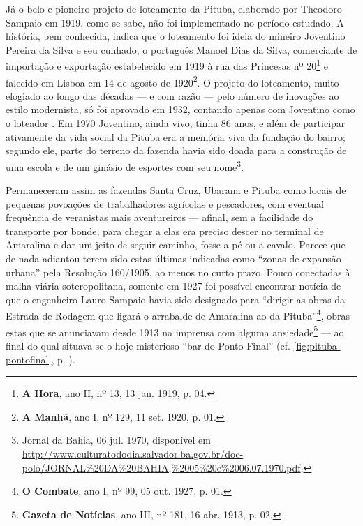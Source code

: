 Já o belo e pioneiro projeto de loteamento da Pituba, elaborado por Theodoro Sampaio em 1919, como se sabe, não foi implementado no período estudado. A história, bem conhecida, indica que o loteamento foi ideia do mineiro Joventino Pereira da Silva e seu cunhado, o português Manoel Dias da Silva, comerciante de importação e exportação estabelecido em 1919 à rua das Princesas nº 20\footnote{\textbf{A Hora}, ano II, nº 13, 13 jan. 1919, p. 04.} e falecido em Lisboa em 14 de agosto de 1920\footnote{\textbf{A Manhã}, ano I, nº 129, 11 set. 1920, p. 01.}. O projeto do loteamento, muito elogiado ao longo das décadas --- e com razão --- pelo número de inovações ao estilo modernista, só foi aprovado em 1932, contando apenas com Joventino como o loteador \cite{leme_urbanismo_1999,santos_theodoro_2010}. Em 1970 Joventino, ainda vivo, tinha 86 anos, e além de participar ativamente da vida social da Pituba era a memória viva da fundação do bairro; segundo ele, parte do terreno da fazenda havia sido doada para a construção de uma escola e de um ginásio de esportes com seu nome\footnote{Jornal da Bahia, 06 jul. 1970, disponível em \url{http://www.culturatododia.salvador.ba.gov.br/doc-polo/JORNAL\%20DA\%20BAHIA,\%2005\%20e\%2006.07.1970.pdf}.}. 

Permaneceram assim as fazendas Santa Cruz, Ubarana e Pituba como locais de pequenas povoações de trabalhadores agrícolas e pescadores, com eventual frequência de veranistas mais aventureiros --- afinal, sem a facilidade do transporte por bonde, para chegar a elas era preciso descer no terminal de Amaralina e dar um jeito de seguir caminho, fosse a pé ou a cavalo. Parece que de nada adiantou terem sido estas últimas indicadas como ``zonas de expansão urbana'' pela Resolução 160/1905, ao menos no curto prazo. Pouco conectadas à malha viária soteropolitana, somente em 1927 foi possível encontrar notícia de que o engenheiro Lauro Sampaio havia sido designado para ``dirigir as obras da Estrada de Rodagem que ligará o arrabalde de Amaralina ao da Pituba''\footnote{\textbf{O Combate}, ano I, nº 99, 05 out. 1927, p. 01.}, obras estas que se anunciavam desde 1913 na imprensa com alguma ansiedade\footnote{\textbf{Gazeta de Notícias}, ano III, nº 181, 16 abr. 1913, p. 02.} --- ao final do qual situava-se o hoje misterioso ``bar do Ponto Final'' (cf. \autoref{fig:pituba-pontofinal}, p. \pageref{fig:pituba-pontofinal}).

